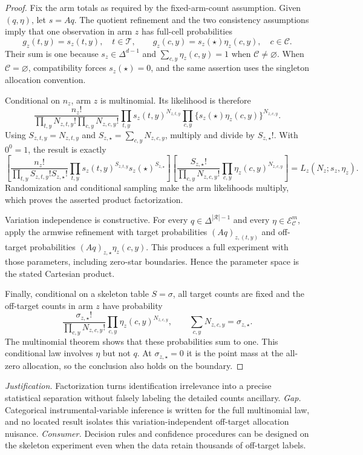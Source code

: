 \documentclass{article}
\begin{document}
\begin{proof}
Fix the arm totals as required by the fixed-arm-count assumption.  Given \((q,\eta)\), let \(s=Aq\).  The quotient refinement and the two consistency assumptions imply that one observation in arm \(z\) has full-cell probabilities
\[
g_z(t,y)=s_z(t,y),\quad t\in\mathcal T,
\qquad
g_z(c,y)=s_z(\star)\eta_z(c,y),\quad c\in\mathcal C.
\]
Their sum is one because \(s_z\in\Delta^{d-1}\) and \(\sum_{c,y}\eta_z(c,y)=1\) when \(\mathcal C\ne\varnothing\).  When \(\mathcal C=\varnothing\), compatibility forces \(s_z(\star)=0\), and the same assertion uses the singleton allocation convention.

Conditional on \(n_z\), arm \(z\) is multinomial.  Its likelihood is therefore
\[
\frac{n_z!}{\prod_{t,y}N_{z,t,y}!\prod_{c,y}N_{z,c,y}!}
\prod_{t,y}s_z(t,y)^{N_{z,t,y}}
\prod_{c,y}\{s_z(\star)\eta_z(c,y)\}^{N_{z,c,y}}.
\]
Using \(S_{z,t,y}=N_{z,t,y}\) and \(S_{z,\star}=\sum_{c,y}N_{z,c,y}\), multiply and divide by \(S_{z,\star}!\).  With \(0^0=1\), the result is exactly
\[
\left[
\frac{n_z!}{\prod_{t,y}S_{z,t,y}!S_{z,\star}!}
\prod_{t,y}s_z(t,y)^{S_{z,t,y}}s_z(\star)^{S_{z,\star}}
\right]
\left[
\frac{S_{z,\star}!}{\prod_{c,y}N_{z,c,y}!}
\prod_{c,y}\eta_z(c,y)^{N_{z,c,y}}
\right]
=L_z(N_z;s_z,\eta_z).
\]
Randomization and conditional sampling make the arm likelihoods multiply, which proves the asserted product factorization.

Variation independence is constructive.  For every \(q\in\Delta^{|\mathcal R|-1}\) and every \(\eta\in\mathcal E_{\mathcal C}^m\), apply the armwise refinement with target probabilities \((Aq)_{z,(t,y)}\) and off-target probabilities \((Aq)_{z,\star}\eta_z(c,y)\).  This produces a full experiment with those parameters, including zero-star boundaries.  Hence the parameter space is the stated Cartesian product.

Finally, conditional on a skeleton table \(S=\sigma\), all target counts are fixed and the off-target counts in arm \(z\) have probability
\[
\frac{\sigma_{z,\star}!}{\prod_{c,y}N_{z,c,y}!}
\prod_{c,y}\eta_z(c,y)^{N_{z,c,y}},
\qquad \sum_{c,y}N_{z,c,y}=\sigma_{z,\star}.
\]
The multinomial theorem shows that these probabilities sum to one.  This conditional law involves \(\eta\) but not \(q\).  At \(\sigma_{z,\star}=0\) it is the point mass at the all-zero allocation, so the conclusion also holds on the boundary.
\end{proof}
\par\smallskip\noindent \textit{Justification.} Factorization turns identification irrelevance into a precise statistical separation without falsely labeling the detailed counts ancillary. \textit{Gap.} Categorical instrumental-variable inference is written for the full multinomial law, and no located result isolates this variation-independent off-target allocation nuisance. \textit{Consumer.} Decision rules and confidence procedures can be designed on the skeleton experiment even when the data retain thousands of off-target labels.
\end{document}
